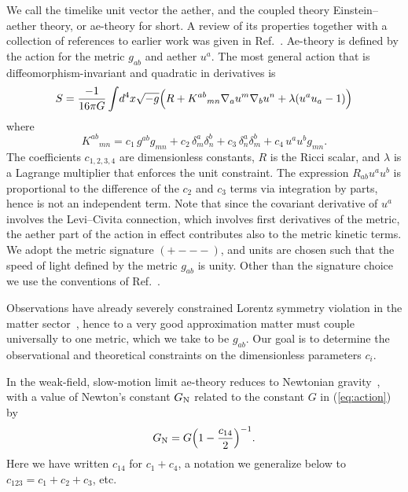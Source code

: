 \documentclass[aps,prd,preprint,amsmath,amssymb]{revtex4}
\def\beq{\begin{equation}}
\def\eeq{\end{equation}}
\begin{document}
We call the timelike unit vector the aether, and the coupled
theory Einstein--aether theory, or ae-theory for short. A
review of its properties together with a collection of references
to earlier work was given in Ref.~\cite{dfest}. Ae-theory is
defined by the action for the metric $g_{ab}$ and aether $u^a$.
The most general action that is diffeomorphism-invariant and
quadratic in derivatives is
%
\begin{equation} \label{eq:action}
    S=\frac{-1}{16\pi G }
        \int \!d^4x \sqrt{-g} \Bigl(R+K^{ab}{}{}_{mn}
            \nabla_a u^m \nabla_b u^n +\lambda (u^a u_a -1)\Bigr)
\end{equation}
%
where
%
\begin{equation}\label{K}
    K^{ab}{}{}_{mn}=c_1\,  g^{ab} g_{mn} + c_2\,  \delta^a_m \delta^b_n
            + c_3\,  \delta^a_n \delta^b_m + c_4\,  u^a u^b g_{mn}.
\end{equation}
%
The coefficients $c_{1,2,3,4}$ are dimensionless constants, $R$ is
the Ricci scalar, and $\lambda$ is a Lagrange multiplier that
enforces the unit constraint. The expression $R_{ab} u^a u^b$ is
proportional to the difference of the $c_2$ and $c_3$ terms via
integration by parts, hence is not an independent term. Note that
since the covariant derivative of $u^a$ involves the Levi--Civita
connection, which involves first derivatives of the metric, the
aether part of the action in effect contributes also to the
metric kinetic terms. We adopt the metric signature
$({+}{-}{-}{-})$, and units are chosen such that the speed of
light defined by the metric $g_{ab}$ is unity. Other than the
signature choice we use the conventions of Ref.~\cite{wald}.

Observations have already severely constrained Lorentz symmetry
violation in the matter sector~\cite{Mattingly:2005re,Bluhm:2005uj},
hence to a very good approximation
matter must couple universally to one metric, which we take to be
$g_{ab}$. Our goal is to determine the observational and
theoretical constraints on the dimensionless parameters $c_i$.

In the weak-field, slow-motion limit ae-theory reduces to
Newtonian gravity~\cite{CLim}, with a value of Newton's constant
$G_{\rm N}$ related to the constant $G$ in (\ref{eq:action}) by
%
\beq\label{GNewton}
    G_{\rm N} = G\Big(1-\frac{c_{14}}{2}\Big)^{-1}.
\eeq
%
Here we have written $c_{14}$ for $c_1+c_4$, a notation
we generalize below to $c_{123}=c_1+c_2+c_3$, etc.
\end{document}
